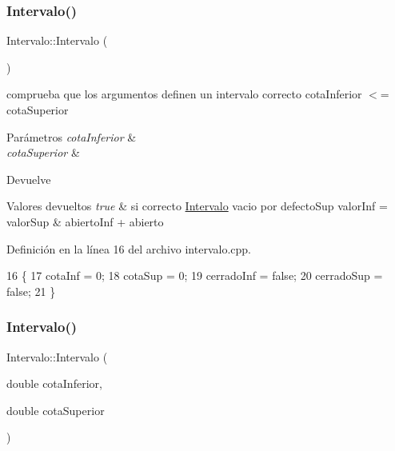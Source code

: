 \subsubsection{\texorpdfstring{Intervalo()}{Intervalo()}\hspace{0.1cm}{\footnotesize\ttfamily [1/3]}}
{\footnotesize\ttfamily Intervalo\+::\+Intervalo (\begin{DoxyParamCaption}{ }\end{DoxyParamCaption})}



comprueba que los argumentos definen un intervalo correcto cota\+Inferior $<$= cota\+Superior 


\begin{DoxyParams}{Parámetros}
{\em cota\+Inferior} & \\
\hline
{\em cota\+Superior} & \\
\hline
\end{DoxyParams}
\begin{DoxyReturn}{Devuelve}

\end{DoxyReturn}

\begin{DoxyRetVals}{Valores devueltos}
{\em true} & si correcto \hyperlink{classIntervalo}{Intervalo} vacio por defecto\+Sup valor\+Inf = valor\+Sup \& abierto\+Inf + abierto \\
\hline
\end{DoxyRetVals}


Definición en la línea 16 del archivo intervalo.\+cpp.


\begin{DoxyCode}
16                     \{
17   cotaInf = 0;
18   cotaSup = 0;
19   cerradoInf = \textcolor{keyword}{false};
20   cerradoSup = \textcolor{keyword}{false};
21 \}
\end{DoxyCode}
\mbox{\label{classIntervalo_a321e56ef7e1f4a774bd64cc2609156f4}} 
\subsubsection{\texorpdfstring{Intervalo()}{Intervalo()}\hspace{0.1cm}{\footnotesize\ttfamily [2/3]}}
{\footnotesize\ttfamily Intervalo\+::\+Intervalo (\begin{DoxyParamCaption}\item[{double}]{cota\+Inferior,  }\item[{double}]{cota\+Superior }\end{DoxyParamCaption})}



